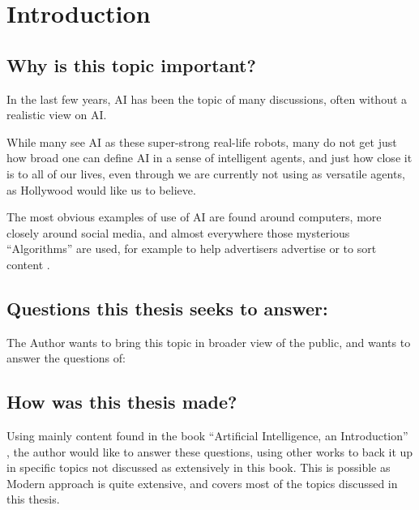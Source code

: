\chapter{Introduction}
\section{Why is this topic important?}
In the last few years, AI has been the topic of many discussions, often without a realistic view on AI.

While many see AI as these super-strong real-life robots, many do not get just how broad one can define AI in a sense of intelligent agents, and just how close it is to all of our lives, even through we are currently not using as versatile agents, as Hollywood would like us to believe.

The most obvious examples of use of AI are found around computers, more closely around social media, and almost everywhere those mysterious “Algorithms” are used, for example to help advertisers advertise \cite{facebookWerbungAufInstagram} or to sort content \cite{googleFunktioniertGoogleSucheSuchalgorithmen}.
\section{Questions this thesis seeks to answer:}
The Author wants to bring this topic in broader view of the public, and wants to answer the questions of: 
\section{How was this thesis made?}
Using mainly content found in the book “Artificial Intelligence, an Introduction” \cite{MA}, the author would like to answer these questions, using other works to back it up in specific topics not discussed as extensively in this book. This is possible as Modern approach is quite extensive, and covers most of the topics discussed in this thesis.